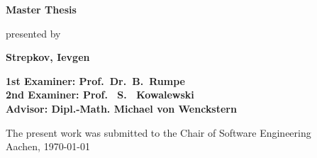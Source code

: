 \begin{titlepage}
\begin{flushleft}
{    {\Large \textbf{Master Thesis}\\}
		\vspace{3em} 
		
		{\large presented by\\} 
    
    {\LARGE \textbf{Strepkov, Ievgen}\\}
    \vspace{3em} 
		    
    {\Large \textbf{1st Examiner: Prof.\ Dr.\ B.\ Rumpe}\\}
    \vspace{1em} 
    {\Large \textbf{2nd Examiner: Prof. \ S. \ Kowalewski}\\}
    \vspace{1em} 
    {\Large \textbf{Advisor: Dipl.-Math. Michael von Wenckstern }\\}
    \vspace{7em} 

    {\large The present work was submitted to the Chair of Software Engineering \\}
    \vspace{1em}
		{\large	Aachen, \today\\}
  }
\end{flushleft}

\end{titlepage}





